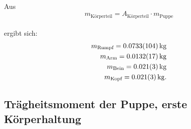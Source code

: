 \\Aus
\begin{equation*}
  m_{\text{Körperteil}}= A_{\text{Körperteil}} \cdot m_{\text{Puppe}}
\end{equation*}
\\ergibt sich:
\begin{align*}
m_{\text{Rumpf}}= \SI{0.0733 \pm 0.0104}{kg} \\
m_{\text{Arm}}= \SI{0.0132 \pm 0.0017}{kg}   \\
m_{\text{Bein}}= \SI{0.021 \pm 0.003}{kg}  \\
m_{\text{Kopf}}= \SI{0.021 \pm 0.003}{kg}.
\end{align*}

\subsection{Trägheitsmoment der Puppe, erste Körperhaltung}

